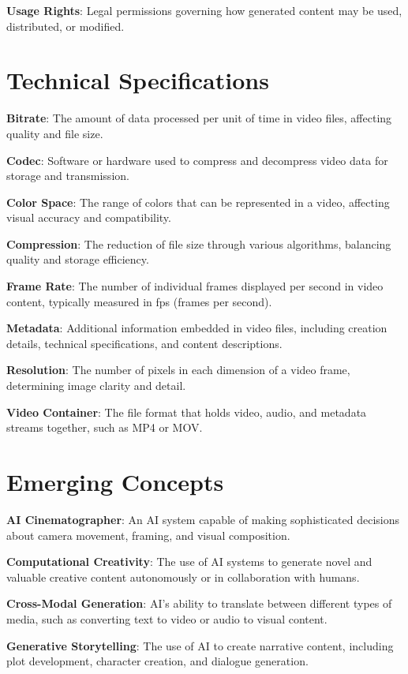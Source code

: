 \textbf{Usage Rights}: Legal permissions governing how generated content may be used, distributed, or modified.

\section{Technical Specifications}

\textbf{Bitrate}: The amount of data processed per unit of time in video files, affecting quality and file size.

\textbf{Codec}: Software or hardware used to compress and decompress video data for storage and transmission.

\textbf{Color Space}: The range of colors that can be represented in a video, affecting visual accuracy and compatibility.

\textbf{Compression}: The reduction of file size through various algorithms, balancing quality and storage efficiency.

\textbf{Frame Rate}: The number of individual frames displayed per second in video content, typically measured in fps (frames per second).

\textbf{Metadata}: Additional information embedded in video files, including creation details, technical specifications, and content descriptions.

\textbf{Resolution}: The number of pixels in each dimension of a video frame, determining image clarity and detail.

\textbf{Video Container}: The file format that holds video, audio, and metadata streams together, such as MP4 or MOV.

\section{Emerging Concepts}

\textbf{AI Cinematographer}: An AI system capable of making sophisticated decisions about camera movement, framing, and visual composition.

\textbf{Computational Creativity}: The use of AI systems to generate novel and valuable creative content autonomously or in collaboration with humans.

\textbf{Cross-Modal Generation}: AI's ability to translate between different types of media, such as converting text to video or audio to visual content.

\textbf{Generative Storytelling}: The use of AI to create narrative content, including plot development, character creation, and dialogue generation.

